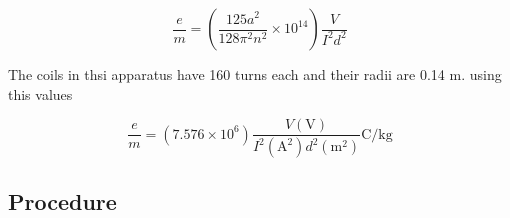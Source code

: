 \documentclass[%
sor,
 jor,
 amsmath,amssymb,
 reprint,
]{revtex4-2}
\begin{document}
\begin{equation}
\frac {e}{m} = \left(\frac {1 2 5 a ^ {2}}{1 2 8 \pi^ {2} n ^ {2}} \times 1 0 ^ {1 4}\right) \frac {V}{I ^ {2} d ^ {2}}
\tag{4}
\end{equation}

The coils in thsi apparatus have 160 turns each and their radii are 0.14 m. using this values 

\begin{equation}
	\boxed{	\frac e m = (7.576 \times  10^6) \frac {V (\si{\volt})} {I^2 (\si{\ampere}^2) d^2 (\si{\meter}^2)} \si{\coulomb \per \kilogram}}
\tag{5}
\end{equation}



\subsection{Procedure}
\end{document}
